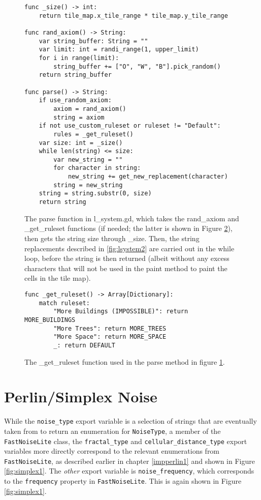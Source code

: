 \begin{figure}[H]
    \centering
    \begin{lstlisting}
func _size() -> int:
	return tile_map.x_tile_range * tile_map.y_tile_range

func rand_axiom() -> String:
	var string_buffer: String = ""
	var limit: int = randi_range(1, upper_limit)
	for i in range(limit):
		string_buffer += ["O", "W", "B"].pick_random()
	return string_buffer
 
func parse() -> String:
	if use_random_axiom:
		axiom = rand_axiom()
		string = axiom
	if not use_custom_ruleset or ruleset != "Default":
		rules = _get_ruleset()
	var size: int = _size()
	while len(string) <= size:
		var new_string = ""
		for character in string:
			new_string += get_new_replacement(character)
		string = new_string
	string = string.substr(0, size)
	return string
    \end{lstlisting}
    \caption{The parse function in l\_system.gd, which takes the rand\_axiom and \_get\_ruleset functions (if needed; the latter is shown in Figure \ref{fig:lsystem6}), then gets the string size through \_size. Then, the string replacements described in \ref{fig:lsystem2} are carried out in the while loop, before the string is then returned (albeit without any excess characters that will not be used in the paint method to paint the cells in the tile map).}
    \label{fig:lsystem5}
\end{figure}

\begin{figure}[H]
    \centering
    \begin{lstlisting}
func _get_ruleset() -> Array[Dictionary]:
	match ruleset:
		"More Buildings (IMPOSSIBLE)": return MORE_BUILDINGS
		"More Trees": return MORE_TREES
		"More Space": return MORE_SPACE
		_: return DEFAULT
    \end{lstlisting}
    \caption{The \_get\_ruleset function used in the parse method in figure \ref{fig:lsystem5}.}
    \label{fig:lsystem6}
\end{figure}

\section{Perlin/Simplex Noise} \label{impperlin2}

While the \verb|noise_type| export variable is a selection of strings that are eventually taken from to return an enumeration for \verb|NoiseType|, a member of the \verb|FastNoiseLite| class\cite{fastnoiselitedocs}, the \verb|fractal_type| and \verb|cellular_distance_type| export variables more directly correspond to the relevant enumerations from \verb|FastNoiseLite|, as described earlier in chapter \ref{impperlin1} and shown in Figure \ref{fig:simplex1}. The \textit{other} export variable is \verb|noise_frequency|, which corresponds to the \verb|frequency| property in \verb|FastNoiseLite|. This is again shown in Figure \ref{fig:simplex1}.

